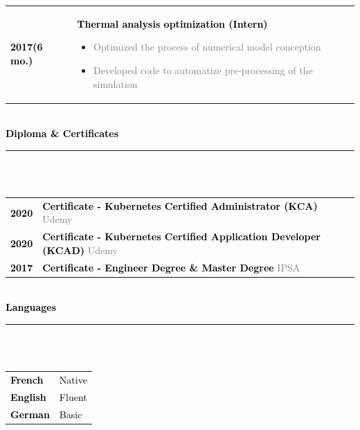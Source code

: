 \documentclass[12pt,A4]{article}
\begin{document}
\begin{minipage}[t]{0.68\textwidth}
\begin{tabular}{P{2.5cm}p{10cm}}
\textcolor{black}{\bf 2017(6 mo.)} & \textcolor{black}{\bf Thermal analysis optimization (Intern)}
\begin{itemize}
  \item \small \textcolor{gray}{Optimized the process of numerical model conception}
  \item \small \textcolor{gray}{Developed code to automatize pre-processing of the simulation}
\end{itemize}\\
\end{tabular}
%
%
\vspace*{1cm}\\
\textcolor{black}{\large \bf Diploma \& Certificates \vspace{-5pt}\\}
\noindent\textcolor{blue}{\rule{13cm}{.8mm}}\\
%
\vspace*{-5pt}\\
\begin{tabular}{P{2.5cm}p{10cm}}
\textcolor{black}{\bf 2020} & \textcolor{black}{ \bf Certificate - Kubernetes Certified Administrator (KCA)}  \newline \small \textcolor{gray}{Udemy} \\
\textcolor{black}{\bf 2020} & \textcolor{black}{ \bf Certificate - Kubernetes Certified Application Developer (KCAD)} \newline \small \textcolor{gray}{Udemy} \\
\textcolor{black}{\bf 2017} & \textcolor{black}{ \bf Certificate - Engineer Degree \& Master Degree} \newline \small \textcolor{gray}{IPSA} \\
\end{tabular}
%
%
\vspace*{1cm}\\
\textcolor{black}{\large \bf Languages \vspace{-5pt}\\}
\noindent\textcolor{blue}{\rule{13cm}{.8mm}}\\
%
\vspace*{-5pt}\\
\begin{tabular}{p{2.5cm}p{10cm}}
\textcolor{black}{\bf French} & \textcolor{black}{ Native } \\
\textcolor{black}{\bf English} & \textcolor{black}{ Fluent } \\
\textcolor{black}{\bf German} & \textcolor{black}{ Basic } \\
\end{tabular}
\end{minipage}
\end{document}
